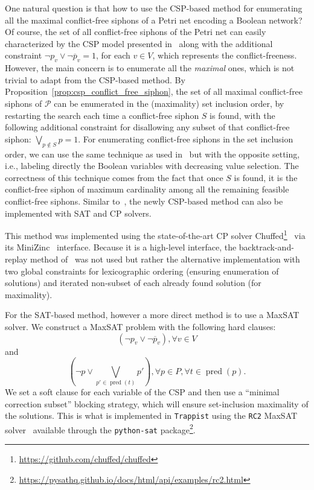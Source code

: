 \documentclass[preprint,12pt]{elsarticle}
\DeclareMathOperator{\pred}{pred}
\begin{document}
One natural question is that how to use the CSP-based method for enumerating all the maximal conflict-free siphons of a Petri net encoding a Boolean network?
Of course, the set of all conflict-free siphons of the Petri net can easily characterized by the CSP model presented in~\cite{nabli2016enumerating} along with the additional constraint \(\neg p_v \vee \neg \overline{p}_v = 1\), for each \(v \in V\), which represents the conflict-freeness.
However, the main concern is to enumerate all the \emph{maximal} ones, which is not trivial to adapt from the CSP-based method.
By Proposition~\ref{prop:csp_conflict_free_siphon}, the set of all maximal conflict-free siphons of \(\mathcal{P}\) can be enumerated in the (maximality) set inclusion order, by restarting the search each time a conflict-free siphon \(S\) is found, with the following additional constraint for disallowing any subset of that conflict-free siphon: \(\bigvee_{p \not \in S} p = 1\).
For enumerating conflict-free siphons in the set inclusion order, we can use the same technique as used in~\cite{nabli2016enumerating} but with the opposite setting, i.e., labeling directly the Boolean variables with decreasing value selection.
The correctness of this technique comes from the fact that once \(S\) is found, it is the conflict-free siphon of maximum cardinality among all the remaining feasible conflict-free siphons.
Similar to~\cite{nabli2016enumerating}, the newly CSP-based method can also be implemented with SAT and CP solvers.

This method was implemented using the state-of-the-art CP solver Chuffed\footnote{\url{https://github.com/chuffed/chuffed}}~\cite{demirovic2018solution} via its MiniZinc~\cite{nethercote2007minizinc} interface.
Because it is a high-level interface, the backtrack-and-replay method of~\cite{nabli2016enumerating} was not used but rather the alternative implementation with two global constraints for lexicographic ordering (ensuring enumeration of solutions) and iterated non-subset of each already found solution (for maximality).

For the SAT-based method, however a more direct method is to use a MaxSAT solver.
We construct a MaxSAT problem with the following hard clauses:
\[
  (\neg p_v \vee \neg \overline{p}_v), \forall v \in V
\]
and
\[
  (\neg p \vee \bigvee_{p' \in \pred(t)}p'), \forall p \in P, \forall t \in \pred(p).
\]
We set a soft clause for each variable of the CSP and then use a ``minimal correction subset'' blocking strategy, which will ensure set-inclusion maximality of the solutions.
This is what is implemented in \texttt{Trappist} using the \texttt{RC2} MaxSAT solver~\cite{DBLP:journals/jsat/IgnatievMM19} available through the \texttt{python-sat} package\footnote{\url{https://pysathq.github.io/docs/html/api/examples/rc2.html}}.
\end{document}
